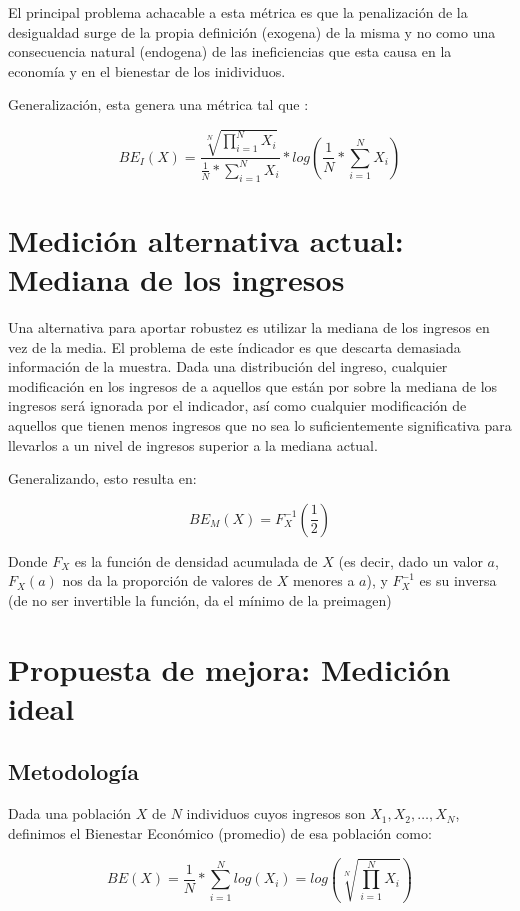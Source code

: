 El principal problema achacable a esta métrica es que la penalización de la desigualdad surge de la propia definición (exogena) de la misma y no como una consecuencia natural (endogena) de las ineficiencias que esta causa en la economía y en el bienestar de los inidividuos.

Generalización, esta genera una métrica tal que :

$$
    BE_I(X) = \frac{\sqrt[N]{\prod_{i=1}^NX_i}}{\frac{1}{N} * \sum_{i=1}^N X_i} * log(\frac{1}{N} * \sum_{i=1}^{N}X_i)
$$

\section{Medición alternativa actual: Mediana de los ingresos}

Una alternativa para aportar robustez es utilizar la mediana de los ingresos en vez de la media. El problema de este índicador es que descarta demasiada información de la muestra. Dada una distribución del ingreso, cualquier modificación en los ingresos de a aquellos que están por sobre la mediana de los ingresos será ignorada por el indicador, así como cualquier modificación de aquellos que tienen menos ingresos que no sea lo suficientemente significativa para llevarlos a un nivel de ingresos superior a la mediana actual.

Generalizando, esto resulta en:

$$
    BE_M(X) = F_X^{-1}(\frac{1}{2})
$$

Donde $F_X$ es la función de densidad acumulada de $X$ (es decir, dado un valor $a$, $F_X(a)$ nos da la proporción de valores de $X$ menores a $a$), y $F_X^{-1}$ es su inversa (de no ser invertible la función, da el mínimo de la preimagen)

\section{Propuesta de mejora: Medición ideal}

\subsection{Metodología}

Dada una población $X$ de $N$ individuos cuyos ingresos son $X_1, X_2, \dots, X_N$, definimos el Bienestar Económico (promedio) de esa población como:

$$
    BE(X) = \frac{1}{N} * \sum_{i=1}^N log(X_i) = log(\sqrt[N]{\prod_{i=1}^N X_i})
$$

